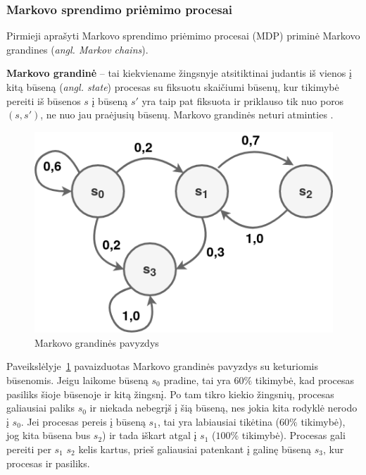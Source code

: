 \documentclass{VUMIFPSbakalaurinis}
\begin{document}
\subsubsection{Markovo sprendimo priėmimo procesai}\label{subsubsec:MDP}
{ 
	Pirmieji aprašyti Markovo sprendimo priėmimo procesai (MDP) \cite{mdp} priminė Markovo grandines (\textit{angl. Markov chains}).\par
	
	\textbf{Markovo grandinė} -- tai kiekviename žingsnyje atsitiktinai judantis iš vienos į kitą būseną (\textit{angl. state}) procesas su fiksuotu skaičiumi būsenų, kur tikimybė pereiti iš būsenos \(s\) į būseną \(s'\) yra taip pat fiksuota ir priklauso tik nuo poros \((s, s')\), ne nuo jau praėjusių būsenų. Markovo grandinės neturi atminties \cite{handson}. 
	
	\begin{figure}[H]
		\centering
		\includegraphics[scale=0.5]{img/markov_chain}
		\caption{Markovo grandinės pavyzdys}
		\label{img:markovChain}
	\end{figure} 
	
	Paveikslėlyje~\ref{img:markovChain} pavaizduotas Markovo grandinės pavyzdys su keturiomis būsenomis. Jeigu laikome būseną \(s_0\) pradine, tai yra \(60\%\) tikimybė, kad procesas pasiliks šioje būsenoje ir kitą žingsnį. Po tam tikro kiekio žingsnių, procesas galiausiai paliks \(s_0\) ir niekada nebegrįš į šią būseną, nes jokia kita rodyklė nerodo į \(s_0\). Jei procesas pereis į būseną \(s_1\), tai yra labiausiai tikėtina (\(60\%\) tikimybė), jog kita būsena bus \(s_2\)) ir tada iškart atgal į \(s_1\) (\(100\%\) tikimybė). Procesas gali pereiti per \(s_1\) \(s_2\) kelis kartus, prieš galiausiai patenkant į galinę būseną \(s_3\), kur procesas ir pasiliks.\par
	
}
\end{document}

